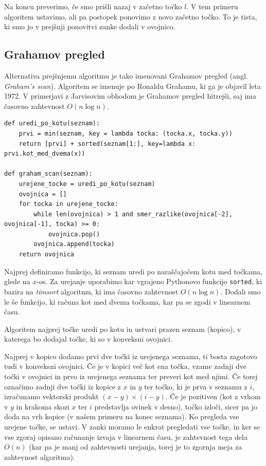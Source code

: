 \documentclass[a4paper]{article}
\begin{document}
Na koncu preverimo, če smo prišli nazaj v začetno točko $l.$ V tem primeru algoritem ustavimo, ali pa postopek ponovimo z novo začetno točko. To je tista, ki smo jo
v prejšnji ponovitvi zanke dodali v ovojnico.

\newpage
\subsection{Grahamov pregled}
Alternativa prejšnjemu algoritmu je tako imenovani Grahamov pregled (angl. \textit{Graham's scan}). Algoritem se imenuje po Ronaldu Grahamu, ki ga je objavil leta 1972. 
V primerjavi z Jarvisovim obhodom je Grahamov pregled hitrejši, saj ima časovno zahtevnost $O(n \log n)$.

\begin{lstlisting}
def uredi_po_kotu(seznam):
    prvi = min(seznam, key = lambda tocka: (tocka.x, tocka.y))
    return [prvi] + sorted(seznam[1:], key=lambda x: prvi.kot_med_dvema(x))

def graham_scan(seznam):
    urejene_tocke = uredi_po_kotu(seznam)
    ovojnica = []
    for tocka in urejene_tocke:
        while len(ovojnica) > 1 and smer_razlike(ovojnica[-2], ovojnica[-1], tocka) >= 0:           
            ovojnica.pop()
        ovojnica.append(tocka)
    return ovojnica
\end{lstlisting}

Najprej definiramo funkcijo, ki seznam uredi po naraščajočem kotu med točkama, glede na $x$-os. Za urejanje uporabimo kar vgrajeno Pythonovo funkcijo \texttt{sorted},
ki bazira na \textit{timsort} algoritmu, ki ima časovno zahtevnost $O(n \log n).$ Dodali smo le še funkcijo, ki računa kot med dvema točkama, kar pa se zgodi v linearnem času.

Algoritem najprej točke uredi po kotu in ustvari prazen seznam (kopico), 
v katerega bo dodajal točke, ki so v konveksni ovojnici.

Najprej v kopico dodamo prvi dve točki iz urejenega seznama, ti bosta zagotovo tudi v konveksni ovojnici.
Če je v kopici več kot ena točka, vzame zadnji dve točki v ovojnici in prvo iz urejenega seznama ter preveri kot med njimi. Če torej označimo zadnji dve točki iz kopice z $x$ in $y$ ter točko,
ki je prva v seznamu z $i$, izračunamo vektorski produkt $(x-y)\times(i-y)$. 
Če je pozitiven (kot z vrhom v $y$ in krakoma skozi $x$ ter $i$ predstavlja ovinek v desno), točko izloči, 
sicer pa jo doda na vrh kopice (v našem primeru na konec seznama). Ko pregleda vse urejene točke, se ustavi. 
V zanki moramo le enkrat pregledati vse točke, in ker se vse zgoraj opisano računanje izvaja v linearnem času, je zahtevnost tega dela $O(n)$ (kar pa je manj od zahtevnosti urejanja,
torej je to zgornja meja za zahtevnost algoritma).
\end{document}
